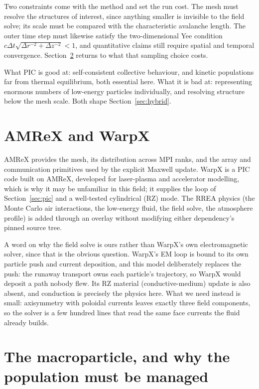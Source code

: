 \documentclass[11pt]{article}
\begin{document}
Two constraints come with the method and set the run cost. The mesh must resolve
the structures of interest, since anything smaller is invisible to the field
solve; its scale must be compared with the characteristic avalanche length.
The outer time step
must likewise satisfy the two-dimensional Yee condition
$c\Delta t\sqrt{\Delta r^{-2}+\Delta z^{-2}}<1$, and quantitative claims
still require spatial and temporal convergence.
Section~\ref{sec:macro} returns to what that sampling choice costs.

What PIC is good at: self-consistent collective behaviour, and kinetic
populations far from thermal equilibrium, both essential here. What it is bad
at: representing enormous numbers of low-energy particles individually, and
resolving structure below the mesh scale. Both shape
Section~\ref{sec:hybrid}.

\section{AMReX and WarpX}

AMReX provides the mesh, its distribution across MPI ranks, and the array and
communication primitives used by the explicit Maxwell update.
WarpX is a PIC code built on AMReX, developed for laser-plasma and accelerator
modelling, which is why it may be unfamiliar in this field; it supplies the loop
of Section~\ref{sec:pic} and a well-tested cylindrical (RZ) mode. The RREA
physics (the Monte Carlo air interactions, the low-energy fluid, the field
solve, the atmosphere profile) is added through an overlay without modifying
either dependency's pinned source tree.

A word on why the field solve is ours rather than WarpX's own electromagnetic
solver, since that is the obvious question. WarpX's EM loop is bound to its own
particle push and current deposition, and this model deliberately replaces the
push: the runaway transport owns each particle's trajectory, so WarpX would
deposit a path nobody flew. Its RZ material (conductive-medium) update is also
absent, and conduction is precisely the physics here. What we need instead is
small: axisymmetry with poloidal currents leaves exactly three field
components, so the solver is a few hundred lines that read the same face
currents the fluid already builds.

\section{The macroparticle, and why the population must be managed}
\label{sec:macro}
\end{document}
